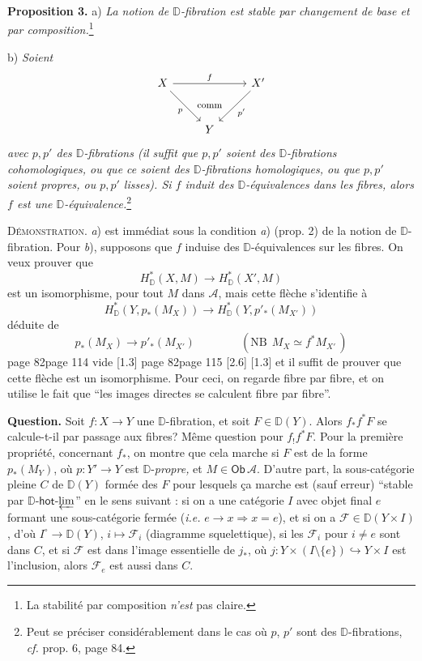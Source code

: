 \documentclass[11pt,leqno]{article}
\newcommand{\msp}[1]{%
  \begingroup\def\thismsp{#1}\def\blankmsp{page 114 vide}%
  \ifx\thismsp\blankmsp
    \marginnote{\scriptsize\sffamily [114: vide]}[1.3\baselineskip]%
  \else\def\followingmsp{page 115}%
    \ifx\thismsp\followingmsp
      \marginnote{\scriptsize\sffamily [page 115]}[2.6\baselineskip]%
    \else\marginnote{\scriptsize\sffamily [#1]}[1.3\baselineskip]\fi
  \fi\endgroup}
\newcommand{\DD}{\ensuremath{\mathbb{D}}}
\newcommand{\Ob}{\ensuremath{\mathsf{Ob}}}
\begin{document}
\textbf{Proposition 3.} a) \textit{La notion de $\DD$-fibration est stable par changement de base et par composition.}\footnote[38]{La stabilité par composition \textit{n'est} pas claire.}

\indent b) \textit{Soient}
\[
\begin{tikzcd}[column sep=normal, row sep=large]
X \arrow[rr, "f"] \arrow[dr, "p"'] & \phantom{X} & X' \arrow[dl, "p'"] \\
& Y &
\arrow[from=1-2, to=2-2, phantom, "\text{\footnotesize comm}"]
\end{tikzcd}
\]
\textit{avec $p,p'$ des $\DD$-fibrations (il suffit que $p,p'$ soient des $\DD$-fibrations cohomologiques, ou que ce soient des $\DD$-fibrations homologiques, ou que $p,p'$ soient propres, ou $p,p'$ lisses). Si $f$ induit des $\DD$-équivalences dans les fibres, alors $f$ est une $\DD$-équivalence.}\footnote[39]{Peut se préciser considérablement dans le cas où $p$, $p'$ sont des $\DD$-fibrations, \textit{cf.} prop. 6, page 84.}

\indent\textsc{Démonstration.} \textit{a}) est immédiat sous la condition \textit{a}) (prop. 2) de la notion de $\DD$-fibration. Pour \textit{b}), supposons que $f$ induise des $\DD$-équivalences sur les fibres. On veux prouver que %
\[
H^*_{\DD}(X,M) \longrightarrow H^*_{\DD}(X',M)
\]
est un isomorphisme, pour tout $M$ dans $\mathcal{A}$, mais cette flèche s'identifie à
\[
H^*_{\DD}(Y, p_*(M_X)) \longrightarrow H^*_{\DD}(Y, p'_*(M_{X'}))
\]
déduite de
\[
p_*(M_X) \longrightarrow p'_*(M_{X'}) \qquad\qquad (\text{NB}\ \ M_X \simeq f^*M_{X'}\,)
\]
\msp{page 82}
et il suffit de prouver que cette flèche est un isomorphisme. Pour ceci, on regarde fibre par fibre, et on utilise le fait que “les images directes se calculent fibre par fibre”.

\textbf{Question.} Soit $f : X \to Y$ une $\DD$-fibration, et soit $F \in \DD(Y)$. Alors $f_*f^*F$ se calcule-t-il par passage aux fibres? Même question pour $f_!f^*F$. Pour la première propriété, concernant $f_*$, on montre que cela marche si $F$ est de la forme $p_*(M_Y)$, où $p : Y' \to Y$ est $\DD$-\textit{propre,} et $M \in \Ob\, \mathcal{A}$. D'autre part, la sous-catégorie pleine $C$ de $\DD(Y)$ formée des $F$ pour lesquels ça marche est (sauf erreur) “stable par $\DD$-$\mathsf{hot}$-$\varprojlim$” en le sens suivant : si on a une catégorie $I$ avec objet final $e$ formant une sous-catégorie fermée (\textit{i.e.} $e \to x \Rightarrow x = e$), et si on a $\mathcal{F} \in \DD(Y \times I)$, d'où $I^\circ \to \DD(Y)$, $i \mapsto \mathcal{F}_i$ (diagramme squelettique), si les $\mathcal{F}_i$ pour $i \neq e$ sont dans $C$, et si $\mathcal{F}$ est dans l'image essentielle de $j_*$, où $j : Y \times (I \setminus \{e\}) \hookrightarrow Y \times I$ est l'inclusion, alors $\mathcal{F}_e$ est aussi dans $C$.
\end{document}
